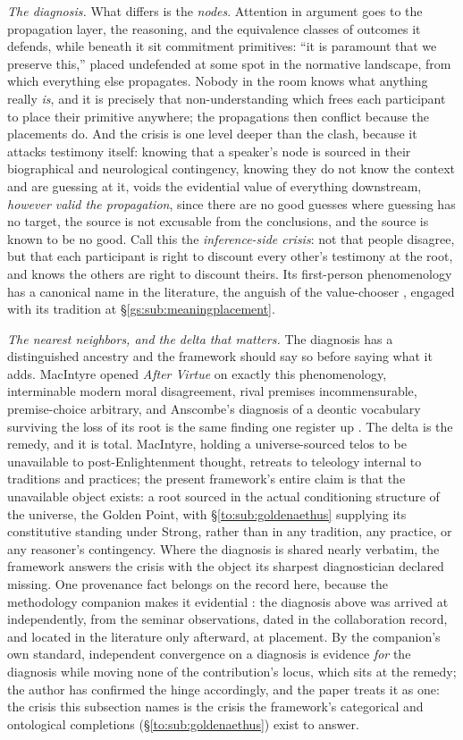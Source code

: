 \documentclass[11pt]{article}
\numberwithin{equation}{section}
\theoremstyle{plain}
\theoremstyle{definition}
\theoremstyle{remark}
\begin{document}
\emph{The diagnosis.} What differs is the \emph{nodes}. Attention in
argument goes to the propagation layer, the reasoning, and the
equivalence classes of outcomes it defends, while beneath it sit
commitment primitives: ``it is paramount that we preserve this,''
placed undefended at some spot in the normative landscape, from which
everything else propagates. Nobody in the room knows what anything
really \emph{is}, and it is precisely that non-understanding which
frees each participant to place their primitive anywhere; the
propagations then conflict because the placements do. And the crisis
is one level deeper than the clash, because it attacks testimony
itself: knowing that a speaker's node is sourced in their biographical
and neurological contingency, knowing they do not know the context
and are guessing at it, voids the evidential value of everything
downstream, \emph{however valid the propagation}, since there are no
good guesses where guessing has no target, the source is not excusable
from the conclusions, and the source is known to be no good. Call this
the \emph{inference-side crisis}: not that people disagree, but that
each participant is right to discount every other's testimony at the
root, and knows the others are right to discount theirs. Its
first-person phenomenology has a canonical name in the literature, the anguish of the value-chooser \cite{Sartre46}, engaged with its
tradition at \S\ref{gs:sub:meaningplacement}.

\emph{The nearest neighbors, and the delta that matters.} The
diagnosis has a distinguished ancestry and the framework should say so
before saying what it adds. MacIntyre opened \emph{After Virtue} on
exactly this phenomenology, interminable modern moral disagreement,
rival premises incommensurable, premise-choice arbitrary, and
Anscombe's diagnosis of a deontic vocabulary surviving the loss of its
root is the same finding one register up \cite{MacIntyre81,
Anscombe58}. The delta is the remedy, and it is total. MacIntyre,
holding a universe-sourced telos to be unavailable to
post-Enlightenment thought, retreats to teleology internal to
traditions and practices; the present framework's entire claim is that
the unavailable object exists: a root sourced in the actual
conditioning structure of the universe, the Golden Point, with
\S\ref{to:sub:goldenaethus} supplying its constitutive standing under
Strong, rather than in any tradition, any practice, or any
reasoner's contingency. Where the diagnosis is shared nearly verbatim,
the framework answers the crisis with the object its sharpest
diagnostician declared missing. One provenance fact belongs on the
record here, because the methodology companion makes it evidential
\cite{Ben26Method}: the diagnosis above was arrived at independently, from the seminar observations, dated in the collaboration record, and located in the literature only afterward, at placement. By the
companion's own standard, independent convergence on a diagnosis is
evidence \emph{for} the diagnosis while moving none of the
contribution's locus, which sits at the remedy; the author has
confirmed the hinge accordingly, and the paper treats it as one: the
crisis this subsection names is the crisis the framework's categorical
and ontological completions (\S\ref{to:sub:goldenaethus}) exist to
answer.
\end{document}
